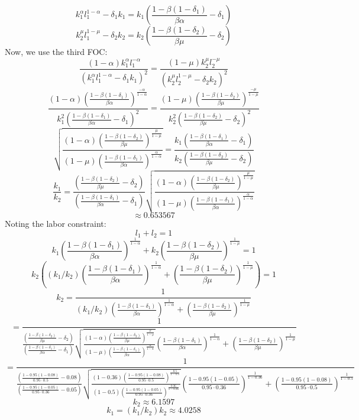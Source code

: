 \documentclass[10pt,letter]{article}
\begin{document}
\[ k_1^\alpha l_1^{1-\alpha} - \delta_1 k_1 = k_1 \left( \frac{1 - \beta (1-\delta_1)}{\beta \alpha}  - \delta_1\right) \]
\[ k_2^\mu l_1^{1-\mu} - \delta_2 k_2 = k_2 \left( \frac{1 -\beta (1-\delta_2)}{\beta \mu} - \delta_2 \right) \]
Now, we use the third FOC:
\[ \frac{(1-\alpha) k_1^\alpha l_1^{-\alpha}}{( k_1^\alpha l_1^{1-\alpha} - \delta_1 k_1 )^2} = \frac{(1-\mu) k_2^\mu l_2^{-\mu}}{( k_2^\mu l_2^{1-\mu} -\delta_2 k_2 )^2} \]
\[ \frac{(1-\alpha) \left( \frac{1 - \beta (1-\delta_1)}{\beta \alpha} \right)^{\frac{-\alpha}{1-\alpha}}}{k_1^2 \left( \frac{1 - \beta (1-\delta_1)}{\beta \alpha}  - \delta_1\right)^2} = \frac{(1-\mu) \left( \frac{1 -\beta (1-\delta_2)}{\beta \mu} \right)^{\frac{-\mu}{1-\mu}}}{k_2^2 \left( \frac{1 -\beta (1-\delta_2)}{\beta \mu} - \delta_2 \right)^2} \]
\[ \sqrt{\frac{(1-\alpha)  \left( \frac{1 -\beta (1-\delta_2)}{\beta \mu} \right)^{\frac{\mu}{1-\mu}}}{(1-\mu)\left( \frac{1 - \beta (1-\delta_1)}{\beta \alpha} \right)^{\frac{\alpha}{1-\alpha}}}} = \frac{k_1 \left( \frac{1 - \beta (1-\delta_1)}{\beta \alpha}  - \delta_1\right)}{k_2 \left( \frac{1 -\beta (1-\delta_2)}{\beta \mu} - \delta_2 \right)} \]
\[ \frac{k_1 }{k_2 } = \frac{\left( \frac{1 -\beta (1-\delta_2)}{\beta \mu} - \delta_2 \right)}{\left( \frac{1 - \beta (1-\delta_1)}{\beta \alpha}  - \delta_1\right)}\sqrt{\frac{(1-\alpha)  \left( \frac{1 -\beta (1-\delta_2)}{\beta \mu} \right)^{\frac{\mu}{1-\mu}}}{(1-\mu)\left( \frac{1 - \beta (1-\delta_1)}{\beta \alpha} \right)^{\frac{\alpha}{1-\alpha}}}}  \]
\[ \approx 0.653567 \]
Noting the labor constraint:
\[ l_1 + l_2 = 1 \]
\[ k_1 \left( \frac{1 - \beta (1-\delta_1)}{\beta \alpha} \right)^{\frac{1}{1-\alpha}} +k_2 \left( \frac{1 -\beta (1-\delta_2)}{\beta \mu} \right)^{\frac{1}{1-\mu}} = 1 \]
\[ k_2 \left((k_1/k_2)\left( \frac{1 - \beta (1-\delta_1)}{\beta \alpha} \right)^{\frac{1}{1-\alpha}} + \left( \frac{1 -\beta (1-\delta_2)}{\beta \mu} \right)^{\frac{1}{1-\mu}}\right) = 1\]
\[ k_2 = \frac{1}{(k_1/k_2)\left( \frac{1 - \beta (1-\delta_1)}{\beta \alpha} \right)^{\frac{1}{1-\alpha}} + \left( \frac{1 -\beta (1-\delta_2)}{\beta \mu} \right)^{\frac{1}{1-\mu}}}\]
\[ = \frac{1}{\frac{\left( \frac{1 -\beta (1-\delta_2)}{\beta \mu} - \delta_2 \right)}{\left( \frac{1 - \beta (1-\delta_1)}{\beta \alpha}  - \delta_1\right)}\sqrt{\frac{(1-\alpha)  \left( \frac{1 -\beta (1-\delta_2)}{\beta \mu} \right)^{\frac{\mu}{1-\mu}}}{(1-\mu)\left( \frac{1 - \beta (1-\delta_1)}{\beta \alpha} \right)^{\frac{\alpha}{1-\alpha}}}} \left( \frac{1 - \beta (1-\delta_1)}{\beta \alpha} \right)^{\frac{1}{1-\alpha}} + \left( \frac{1 -\beta (1-\delta_2)}{\beta \mu} \right)^{\frac{1}{1-\mu}}} \]
\[ = \frac{1}{\frac{\left( \frac{1 - 0.95 (1-0.08)}{0.95\cdot  0.5} - 0.08 \right)}{\left( \frac{1 - 0.95 (1-0.05)}{0.95 \cdot 0.36}  - 0.05\right)}\sqrt{\frac{(1-0.36)  \left( \frac{1 -0.95 (1-0.08)}{0.95 \cdot 0.5} \right)^{\frac{0.5}{1-0.5}}}{(1-0.5)\left( \frac{1 - 0.95 (1-0.05)}{0.95 \cdot 0.36} \right)^{\frac{0.36}{1-0.36}}}} \left( \frac{1 - 0.95 (1-0.05)}{0.95 \cdot 0.36} \right)^{\frac{1}{1-0.36}} + \left( \frac{1 -0.95 (1-0.08)}{0.95 \cdot 0.5} \right)^{\frac{1}{1-0.5}}} \]
\[ k_2 \approx 6.1597 \]
\[ k_1 = (k_1/k_2)k_2 \approx 4.0258 \]
\end{document}
